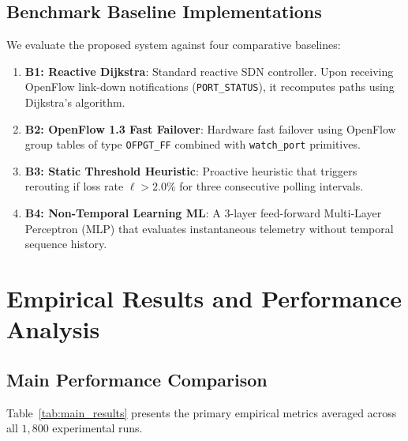 \documentclass[11pt,a4paper]{report}
\begin{document}
\section{Benchmark Baseline Implementations}
We evaluate the proposed system against four comparative baselines:
\begin{enumerate}
    \item \textbf{B1: Reactive Dijkstra}: Standard reactive SDN controller. Upon receiving OpenFlow link-down notifications (\texttt{PORT\_STATUS}), it recomputes paths using Dijkstra's algorithm.
    \item \textbf{B2: OpenFlow 1.3 Fast Failover}: Hardware fast failover using OpenFlow group tables of type \texttt{OFPGT\_FF} combined with \texttt{watch\_port} primitives.
    \item \textbf{B3: Static Threshold Heuristic}: Proactive heuristic that triggers rerouting if loss rate $\ell > 2.0\%$ for three consecutive polling intervals.
    \item \textbf{B4: Non-Temporal Learning ML}: A 3-layer feed-forward Multi-Layer Perceptron (MLP) that evaluates instantaneous telemetry without temporal sequence history.
\end{enumerate}

\chapter{Empirical Results and Performance Analysis}

\section{Main Performance Comparison}
Table~\ref{tab:main_results} presents the primary empirical metrics averaged across all $1{,}800$ experimental runs.
\end{document}
